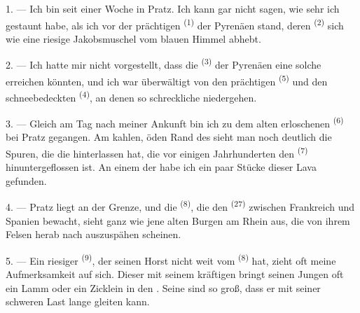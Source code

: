 \VUsaut{4.0mm}
\VUsaut{3.0mm}

\VUsaut{3.0mm}

\VUsaut{3.0mm}

1. --- Ich bin seit einer Woche in Pratz. Ich kann gar nicht sagen, wie sehr ich
gestaunt habe, als ich vor der prächtigen  \textsuperscript{(1)} der
Pyrenäen stand, deren  \textsuperscript{(2)} sich wie eine riesige
Jakobsmuschel vom blauen Himmel abhebt.

2. --- Ich hatte mir nicht vorgestellt, dass die 
\textsuperscript{(3)} der Pyrenäen eine solche  erreichen könnten, und
ich war überwältigt von den prächtigen  \textsuperscript{(5)} und
den schneebedeckten  \textsuperscript{(4)}, an denen so
schreckliche  niedergehen.

\VUsaut{3.0mm}
\VUsaut{3.0mm}

3. --- Gleich am Tag nach meiner Ankunft bin ich zu dem alten erloschenen
 \textsuperscript{(6)} bei Pratz gegangen. Am kahlen, öden Rand des
 sieht man noch deutlich die Spuren, die die 
hinterlassen hat, die vor einigen Jahrhunderten den 
\textsuperscript{(7)} hinuntergeflossen ist. An einem der  habe ich ein
paar Stücke dieser Lava gefunden.

4. --- Pratz liegt an der Grenze, und die  \textsuperscript{(8)}, die
den  \textsuperscript{(27)} zwischen Frankreich und Spanien bewacht,
sieht ganz wie jene alten Burgen am Rhein aus, die von ihrem Felsen herab nach
 auszuspähen scheinen.

5. --- Ein riesiger  \textsuperscript{(9)}, der seinen Horst nicht weit
vom  \textsuperscript{(8)} hat, zieht oft meine Aufmerksamkeit auf sich.
Dieser  mit seinem kräftigen  bringt seinen
Jungen oft ein Lamm oder ein Zicklein in den . Seine
 sind so groß, dass er mit seiner schweren Last lange gleiten kann.

\VUsaut{3.0mm}
\VUsaut{3.0mm}

